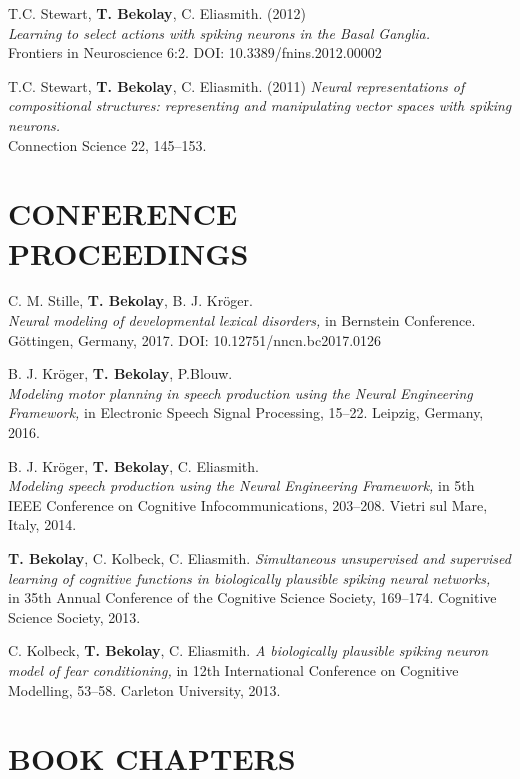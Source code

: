 \documentclass[line,margin]{res}
\begin{document}
\begin{resume}
T.C. Stewart, \textbf{T. Bekolay}, C. Eliasmith. (2012) \\
  {\sl Learning to select actions with spiking neurons in the
  Basal Ganglia.} \\
  Frontiers in Neuroscience 6:2. DOI: 10.3389/fnins.2012.00002

T.C. Stewart, \textbf{T. Bekolay}, C. Eliasmith. (2011)
  {\sl Neural representations of compositional structures:
  representing and manipulating vector spaces with spiking neurons.} \\
  Connection Science 22, 145--153.

\section{CONFERENCE \\PROCEEDINGS}

C. M. Stille, \textbf{T. Bekolay}, B. J. Kr\"{o}ger. \\
  {\sl Neural modeling of developmental lexical disorders,}
  in Bernstein Conference.
  G\"{o}ttingen, Germany, 2017.
  DOI: 10.12751/nncn.bc2017.0126

B. J. Kr\"{o}ger, \textbf{T. Bekolay}, P.Blouw. \\
  {\sl Modeling motor planning in speech production using
    the Neural Engineering Framework,}
  in Electronic Speech Signal Processing, 15--22.
  Leipzig, Germany, 2016.

B. J. Kr\"{o}ger, \textbf{T. Bekolay}, C. Eliasmith. \\
  {\sl Modeling speech
  production using the Neural Engineering Framework,}
  in 5th IEEE Conference on Cognitive Infocommunications, 203--208.
  Vietri sul Mare, Italy, 2014.

\textbf{T. Bekolay}, C. Kolbeck, C. Eliasmith. {\sl Simultaneous
  unsupervised and supervised learning of cognitive functions
  in biologically plausible spiking neural networks,} \\ in 35th Annual
  Conference of the Cognitive Science Society, 169--174.
  Cognitive Science Society, 2013.

C. Kolbeck, \textbf{T. Bekolay}, C. Eliasmith. {\sl A biologically
  plausible spiking neuron model of fear conditioning,} in 12th International
  Conference on Cognitive Modelling, 53--58.
  Carleton University, 2013.

\section{BOOK CHAPTERS}


\end{resume}
\end{document}
